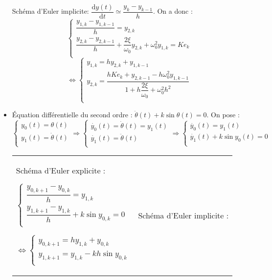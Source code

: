 \begin{itemize}[label=,font=\color{ocre}]
{\begin{multicols}{2}
Schéma d'Euler implicite: $\dfrac{\text{d} y(t)}{\text{d}t}\simeq \dfrac{y_{k}-y_{k-1}}{h}$. On a donc :
$$
\left\{
\begin{array}{l}
\dfrac{y_{1,k}-y_{1,k-1}}{h} = y_{2,k} \\
\dfrac{y_{2,k}-y_{2,k-1}}{h} + \dfrac{2\xi}{\omega_0} y_{2,k}+ \omega_0^2 y_{1,k} = Ke_k \\
\end{array}
\right.$$
$$
\Leftrightarrow 
\left\{
\begin{array}{l}
y_{1,k} = hy_{2,k}+y_{1,k-1} \\
y_{2,k} =\dfrac{h Ke_k+y_{2,k-1} - h\omega_0^2 y_{1,k-1}}{1+  h \dfrac{2\xi}{\omega_0} +  \omega_0^2 h^2 } \\
\end{array}
\right.$$\end{multicols}}
\normalsize

\item Équation différentielle du second ordre : $\ddot{\theta}(t) + k \sin \theta(t) = 0$.
On pose : 
$$
\left\{
\begin{array}{l}
y_0(t) = \theta(t) \\
y_1(t) = \dot{\theta}(t) \\
\end{array}
\right. 
\Rightarrow 
\left\{
\begin{array}{l}
\dot{y_0}(t) = \dot{\theta}(t) = y_1(t) \\
\dot{y_1}(t) = \ddot{\theta}(t) \\
\end{array}
\right.
\Rightarrow 
\left\{
\begin{array}{l}
\dot{y_0}(t) = y_1(t) \\
\dot{y_1}(t) + k \sin y_0 (t) = 0 \\
\end{array}
\right.
$$



\begin{center}
\begin{tabular}{p{.47\linewidth}|p{.47\linewidth}}
Schéma d'Euler explicite :   

$
\left\{
\begin{array}{l}
\dfrac{y_{0,k+1}-y_{0,k}}{h} = y_{1,k} \\
\dfrac{y_{1,k+1}-y_{1,k}}{h} + k \sin y_{0,k} = 0 \\
\end{array}
\right.$

$\Leftrightarrow 
\left\{
\begin{array}{l}
y_{0,k+1} = h y_{1,k} +y_{0,k} \\
y_{1,k+1} = y_{1,k} - kh \sin y_{0,k} \\
\end{array}
\right.$
&
Schéma d'Euler implicite : 


\end{tabular}
\end{center}
\end{itemize}

